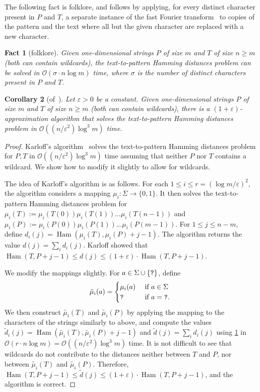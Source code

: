 \documentclass[11pt, letterpaper]{article}
\theoremstyle{plain}
\newtheorem{fact}{Fact}
\newtheorem{corollary}[fact]{Corollary}
\theoremstyle{definition}
\theoremstyle{remark}
\renewcommand{\O}{\mathcal{O}}
\DeclareMathOperator*{\Ham}{Ham}
\begin{document}
The following fact is folklore, and follows by applying, for every distinct character present in $P$ and $T$, a separate instance of the fast Fourier transform~\cite{FischerP74} to copies of the pattern and the text where all but the given character are replaced with a new character.

\begin{fact}[folklore]\label{fact:sigman1d}
Given one-dimensional strings $P$ of size $m$ and $T$ of size $n \ge m$ (both can contain wildcards), the text-to-pattern Hamming distances problem can be solved in $\O(\sigma \cdot n \log m)$ time, where $\sigma$ is the number of distinct characters present in $P$ and $T$.
\end{fact}

\begin{corollary}[of~\cite{Karloff1993}]\label{cor:approx1d}
Let $\varepsilon > 0$ be a constant. Given one-dimensional strings $P$ of size $m$ and $T$ of size $n \ge m$ (both can contain wildcards), there is a $(1+\varepsilon)$-approximation algorithm that solves the text-to-pattern Hamming distances problem in $\O((n/\varepsilon^2)  \log^3 m)$ time.
\end{corollary}
\begin{proof}
Karloff's algorithm~\cite{Karloff1993} solves the text-to-pattern Hamming distances problem for $P,T$ in $\O((n/\varepsilon^2)  \log^3 m)$ time assuming that neither $P$ nor $T$ contains a wildcard. We show how to modify it slightly to allow for wildcards. 

The idea of Karloff's algorithm is as follows. For each $1 \le i \le r = (\log m/ \varepsilon)^2$, the algorithm considers a mapping $\mu_i : \Sigma \rightarrow \{0,1\}$. It then solves the text-to-pattern Hamming distances problem for $\mu_i(T) := \mu_i(T(0))\mu_i(T(1)) \ldots \mu_i(T(n-1))$ and $\mu_i(P) := \mu_i(P(0))\mu_i(P(1)) \ldots \mu_i(P(m-1))$. For $1 \le j \le n-m$, define $d_i(j) = \Ham(\mu_i(T), \mu_i(P)+j-1)$. The algorithm returns the value $d(j) = \sum_i d_i(j)$. Karloff showed that $\Ham(T, P+j-1) \le d(j) \le (1+\varepsilon) \cdot \Ham(T, P+j-1)$.

We modify the mappings slightly. For $a \in \Sigma \cup \{\texttt{?}\}$, define
$$
\tilde{\mu}_i(a) = 
\begin{cases}
\mu_i(a) &\text{ if } a \in \Sigma\\
\texttt{?} & \text{ if } a = \texttt{?}.
\end{cases}
$$
We then construct $\tilde{\mu_i}(T)$ and $\tilde{\mu_i}(P)$ by applying the mapping to the characters of the strings similarly to above, and compute the values $\tilde{d}_i(j) = \Ham(\tilde{\mu_i}(T), \tilde{\mu_i}(P)+j-1)$ and $\tilde{d}(j) = \sum_i d_i(j)$ using \cref{fact:sigman1d} in $\O(r \cdot n \log m) = \O((n/\varepsilon^2) \log^3 m)$ time. It is not difficult to see that wildcards do not contribute to the distances neither between $T$ and $P$, nor between $\tilde{\mu_i}(T)$ and $\tilde{\mu_i}(P)$. Therefore, $\Ham(T, P+j-1) \le \tilde{d}(j) \le (1+\varepsilon) \cdot \Ham(T, P+j-1)$, and the algorithm is correct. 
\end{proof}
\end{document}
